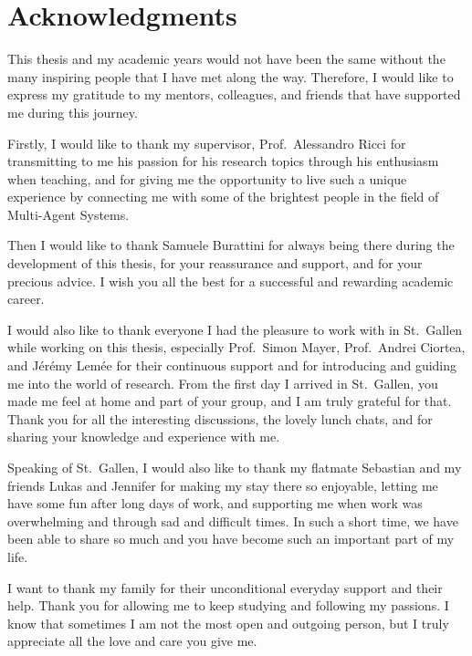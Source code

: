 \chapter*{Acknowledgments}

This thesis and my academic years would not have been the same without the many inspiring people that I have met along the way.
Therefore, I would like to express my gratitude to my mentors, colleagues, and friends that have supported me during this journey.

Firstly, I would like to thank my supervisor, Prof.\ Alessandro Ricci for transmitting to me his passion for his research topics through his enthusiasm when teaching, and for giving me the opportunity to live such a unique experience by connecting me with some of the brightest people in the field of Multi-Agent Systems.

Then I would like to thank Samuele Burattini for always being there during the development of this thesis, for your reassurance and support, and for your precious advice.
I wish you all the best for a successful and rewarding academic career.

I would also like to thank everyone I had the pleasure to work with in St.\ Gallen while working on this thesis, especially Prof.\ Simon Mayer, Prof.\ Andrei Ciortea, and J\'{e}r\'{e}my Lem\'{e}e for their continuous support and for introducing and guiding me into the world of research.
From the first day I arrived in St.\ Gallen, you made me feel at home and part of your group, and I am truly grateful for that.
Thank you for all the interesting discussions, the lovely lunch chats, and for sharing your knowledge and experience with me.

Speaking of St.\ Gallen, I would also like to thank my flatmate Sebastian and my friends Lukas and Jennifer for making my stay there so enjoyable, letting me have some fun after long days of work, and supporting me when work was overwhelming and through sad and difficult times.
In such a short time, we have been able to share so much and you have become such an important part of my life.

I want to thank my family for their unconditional everyday support and their help.
Thank you for allowing me to keep studying and following my passions.
I know that sometimes I am not the most open and outgoing person, but I truly appreciate all the love and care you give me.

